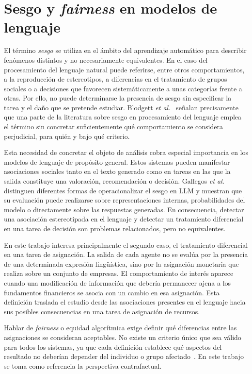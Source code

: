 \section{Sesgo y \textit{fairness} en modelos de lenguaje}
\label{sec:sesgo_fairness}

El término \textit{sesgo} se utiliza en el ámbito del aprendizaje automático para describir fenómenos distintos y no necesariamente equivalentes. En el caso del procesamiento del lenguaje natural puede referirse, entre otros comportamientos, a la reproducción de estereotipos, a diferencias en el tratamiento de grupos sociales o a decisiones que favorecen sistemáticamente a unas categorías frente a otras. Por ello, no puede determinarse la presencia de sesgo sin especificar la tarea y el daño que se pretende estudiar. Blodgett \textit{et al.}~\cite{blodgett2020language} señalan precisamente que una parte de la literatura sobre sesgo en procesamiento del lenguaje emplea el término sin concretar suficientemente qué comportamiento se considera perjudicial, para quién y bajo qué criterio.

Esta necesidad de concretar el objeto de análisis cobra especial importancia en los modelos de lenguaje de propósito general. Estos sistemas pueden manifestar asociaciones sociales tanto en el texto generado como en tareas en las que la salida constituye una valoración, recomendación o decisión. Gallegos \textit{et al.}~\cite{gallegos2024bias} distinguen diferentes formas de operacionalizar el sesgo en LLM y muestran que su evaluación puede realizarse sobre representaciones internas, probabilidades del modelo o directamente sobre las respuestas generadas. En consecuencia, detectar una asociación estereotipada en el lenguaje y detectar un tratamiento diferencial en una tarea de decisión son problemas relacionados, pero no equivalentes.

En este trabajo interesa principalmente el segundo caso, el tratamiento diferencial en una tarea de asignación. La salida de cada agente no se evalúa por la presencia de una determinada expresión lingüística, sino por la asignación monetaria que realiza sobre un conjunto de empresas. El comportamiento de interés aparece cuando una modificación de información que debería permanecer ajena a los fundamentos financieros se asocia con un cambio en esa asignación. Esta definición traslada el estudio desde las asociaciones presentes en el lenguaje hacia sus posibles consecuencias en una tarea de asignación de recursos.

Hablar de \textit{fairness} o equidad algorítmica exige definir qué diferencias entre las asignaciones se consideran aceptables. No existe un criterio único que sea válido para todos los sistemas, ya que cada definición establece qué aspectos del resultado no deberían depender del individuo o grupo afectado~\cite{gallegos2024bias}. En este trabajo se toma como referencia la perspectiva contrafactual.

